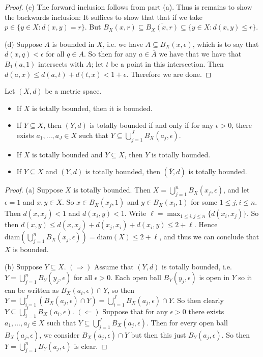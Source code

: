 \documentclass[10pt,reqno]{amsart}
\theoremstyle{definition}
\begin{document}
\begin{tcolorbox}[colback=black!5!white,colframe=black!75!black,title= Chapter 4 $\S 1.2$: Exercise 1.14.]
\begin{proof}
(c) The forward inclusion follows from part (a). Thus is remains to show the backwards inclusion: It suffices to show that that if we take $p \in \{ y \in X \colon d(x,y) = r \}$. But $B_X(x,r) \subseteq \overline{B_X(x,r)} \subseteq \{y \in X \colon d(x,y) \leq r \}$. 

(d) Suppose $A$ is bounded in $X$, i.e. we have $A \subseteq B_X(x, \epsilon)$, which is to say that $d(x, q) < \epsilon$ for all $q \in A$. So then for any $a \in \overline{A}$ we have that we have that $B_1(a, 1)$ intersects with $A$; let $t$ be a point in this intersection. Then $d(a, x) \leq d(a, t) + d(t,x) <1+\epsilon$. Therefore we are done. 

\end{proof}
\end{tcolorbox}\begin{tcolorbox}[colback=black!5!white,colframe=black!75!black,title=  Exercise 1.15.] Let $(X, d)$ be a metric space. 

\begin{itemize}
	\item[(a)] If $X$ is totally bounded, then it is bounded.
	\item[(b)] If $Y \subseteq X$, then $(Y,d)$ is totally bounded if and only if for any $\epsilon > 0$, there exists $a_1, \ldots, a_J \in X$ such that $Y \subseteq \bigcup_{j=1}^J B_X(a_j, \epsilon)$.
	\item[(c)] If $X$ is totally bounded and $Y \subseteq X$, then $Y$ is totally bounded.
	\item[(d)] If $Y \subseteq X$ and $(Y,d)$ is totally bounded, then $(\overline{Y}, d)$ is totally bounded.
\end{itemize}
\tcblower 
\begin{proof} (a) Suppose $X$ is totally bounded. Then $X = \bigcup_{j=1}^n B_X(x_j, \epsilon)$, and let $\epsilon = 1$ and $x,y \in X$. So $x \in B_X(x_j, 1)$ and $y \in B_X(x_i, 1)$ for some $1 \leq j,i \leq n$. Then $d(x,x_j) < 1$ and $d(x_i, y) < 1$. Write $\ell = \max_{1\leq i, j \leq n} \{ d(x_i, x_j) \}$. So then $d(x,y) \leq d(x, x_j) + d(x_j, x_i) + d(x_i, y) \leq  2 + \ell $. Hence $\text{diam} (\bigcup_{j=1}^n B_X(x_j, \epsilon)) = \text{diam}(X) \leq 2 + \ell $, and thus we can conclude that $X$ is bounded. 

(b) Suppose $Y \subseteq X$. $(\Rightarrow)$ Assume that $(Y,d)$ is totally bounded, i.e. $Y = \bigcup _{j=1}^n B_Y (y_j, \epsilon)$ for all $\epsilon > 0$. Each open ball $B_Y(y_j, \epsilon)$ is open in $Y$ so it can be written as $B_X(a_i, \epsilon) \cap Y$, so then $Y = \bigcup_{i=1}^J (B_X(a_j, \epsilon) \cap Y) = \bigcup_{i=1}^J B_X(a_j, \epsilon) \cap Y$. So then clearly $Y \subseteq \bigcup_{i=1}^J B_X(a_i, \epsilon)$. $(\Leftarrow)$ Suppose that for any $\epsilon > 0$ there exists $a_1, \ldots, a_j \in X$ such that $Y \subseteq \bigcup_{j=1}^J B_X (a_j,\epsilon)$. Then for every open ball $B_X(a_j, \epsilon)$, we consider $B_X(a_j, \epsilon) \cap Y$  but then this just $B_Y(a_j, \epsilon)$. So then $Y = \bigcup_{j=1}^n B_Y(a_j, \epsilon)$ is clear. 



\end{proof}
\end{tcolorbox}
\end{document}
